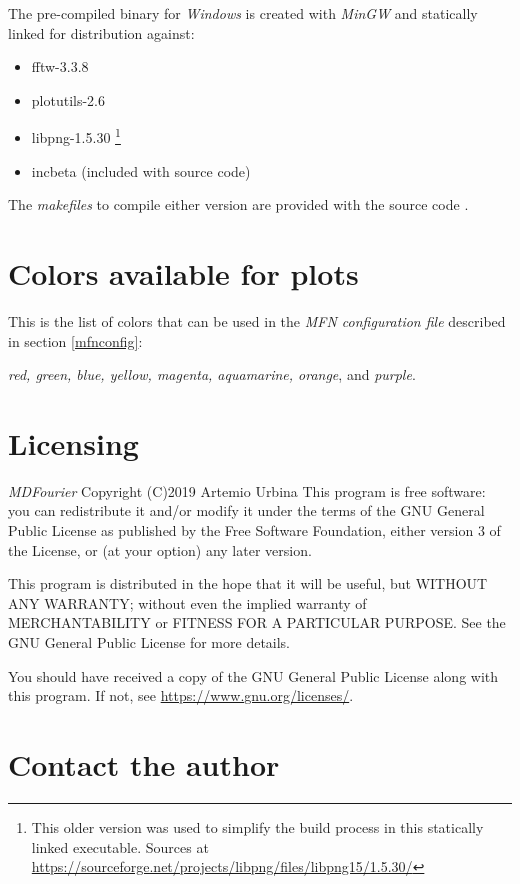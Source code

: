 \documentclass[10pt,a4paper]{report}
\begin{document}
\begin{appendices}
The pre-compiled binary for \textit{Windows} is created with \textit{MinGW}\cite{mingw} and statically linked for distribution against:

\begin{itemize}
	\item fftw-3.3.8 \cite{fftw}
	\item plotutils-2.6 \cite{libplot}
	\item libpng-1.5.30 \footnote{This older version was used to simplify the build process in this statically linked executable. Sources at \url{https://sourceforge.net/projects/libpng/files/libpng15/1.5.30/}}
	\item incbeta \cite{betafunction} (included with source code)
\end{itemize}

The \textit{makefiles} to compile either version are provided with the source code \cite{sourcecode}.

\chapter{Colors available for plots}
\label{availablecolors}

This is the list of colors that can be used in the \textit{MFN configuration file} described in section \ref{mfnconfig}: 

\textit{red, green, blue, yellow, magenta, aquamarine, orange}, and \textit{purple}.

\chapter{Licensing}

\textit{MDFourier} Copyright (C)2019 Artemio Urbina
\label{license}
This program is free software: you can redistribute it and/or modify
it under the terms of the GNU General Public License as published by
the Free Software Foundation, either version 3 of the License, or
(at your option) any later version.

This program is distributed in the hope that it will be useful,
but WITHOUT ANY WARRANTY; without even the implied warranty of
MERCHANTABILITY or FITNESS FOR A PARTICULAR PURPOSE.  See the
GNU General Public License for more details.

You should have received a copy of the GNU General Public License
along with this program.  If not, see \url{https://www.gnu.org/licenses/}.	

\chapter{Contact the author}
\label{contact}


\end{appendices}
\end{document}
